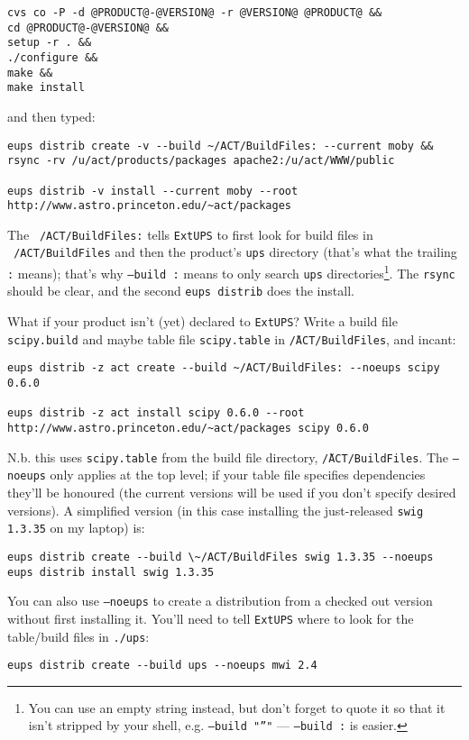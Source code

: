 \documentclass{article}
\newcommand{\code}[1]{\texttt{#1}}
\newcommand{\eups}{\code{ExtUPS}}
\begin{document}
\begin{itemize}
\begin{verbatim}
cvs co -P -d @PRODUCT@-@VERSION@ -r @VERSION@ @PRODUCT@ &&
cd @PRODUCT@-@VERSION@ &&
setup -r . &&
./configure &&
make &&
make install
\end{verbatim}
and then typed:
\begin{verbatim}
eups distrib create -v --build ~/ACT/BuildFiles: --current moby &&
rsync -rv /u/act/products/packages apache2:/u/act/WWW/public

eups distrib -v install --current moby --root http://www.astro.princeton.edu/~act/packages
\end{verbatim}
The \code{~/ACT/BuildFiles:} tells \eups{} to first look for build files
in \code{~/ACT/BuildFiles} and then the product's \code{ups} directory (that's what
the trailing \code{:} means); that's why \code{--build :} means to only search \code{ups}
directories\footnote{
  You can use an empty string instead, but don't forget to quote it so that it isn't
  stripped by your shell, e.g. \code{--build "''"} --- \code{--build :} is easier.
  }. The \code{rsync} should be clear, and the second
\code{eups distrib} does the install.

What if your product isn't (yet) declared to \eups?  Write a build file \code{scipy.build} and
maybe table file \code{scipy.table} in \code{\~/ACT/BuildFiles}, and incant:
\begin{verbatim}
eups distrib -z act create --build ~/ACT/BuildFiles: --noeups scipy 0.6.0

eups distrib -z act install scipy 0.6.0 --root http://www.astro.princeton.edu/~act/packages scipy 0.6.0
\end{verbatim}
N.b. this uses \code{scipy.table} from the build file directory, \code{\~/ACT/BuildFiles}. The
\code{--noeups} only applies at the top level;  if your table file specifies dependencies
they'll be honoured (the current versions will be used if you don't specify desired versions). A
simplified version (in this case installing the just-released \code{swig 1.3.35} on my laptop) is:
\begin{verbatim}
eups distrib create --build \~/ACT/BuildFiles swig 1.3.35 --noeups
eups distrib install swig 1.3.35
\end{verbatim}

You can also use \code{--noeups} to create a distribution from a checked out version without
first installing it.  You'll need to tell \eups{} where to look for the table/build files
in \code{./ups}:
\begin{verbatim}
eups distrib create --build ups --noeups mwi 2.4
\end{verbatim}


\end{itemize}
\end{document}
